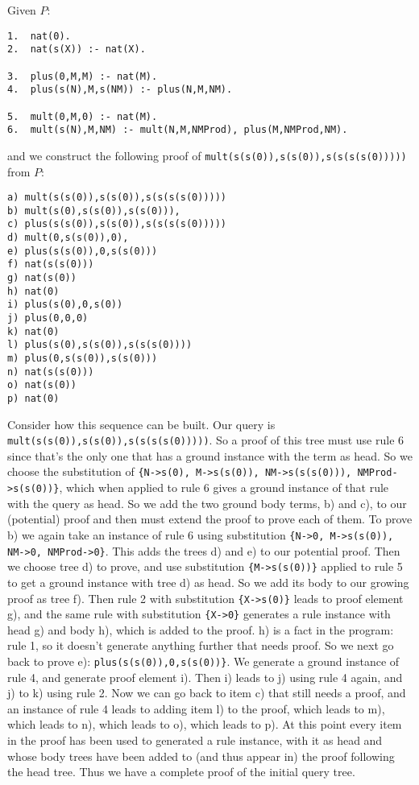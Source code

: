 \begin{example}
  Given $P$:
\begin{verbatim}
1.  nat(0).
2.  nat(s(X)) :- nat(X).

3.  plus(0,M,M) :- nat(M).
4.  plus(s(N),M,s(NM)) :- plus(N,M,NM).

5.  mult(0,M,0) :- nat(M).
6.  mult(s(N),M,NM) :- mult(N,M,NMProd), plus(M,NMProd,NM).
\end{verbatim}
and we construct the following  proof of
\verb|mult(s(s(0)),s(s(0)),s(s(s(s(0)))))| from $P$:
\begin{verbatim}
a) mult(s(s(0)),s(s(0)),s(s(s(s(0)))))
b) mult(s(0),s(s(0)),s(s(0))),
c) plus(s(s(0)),s(s(0)),s(s(s(s(0)))))
d) mult(0,s(s(0)),0),
e) plus(s(s(0)),0,s(s(0)))
f) nat(s(s(0)))
g) nat(s(0))
h) nat(0)
i) plus(s(0),0,s(0))
j) plus(0,0,0)
k) nat(0)
l) plus(s(0),s(s(0)),s(s(s(0))))
m) plus(0,s(s(0)),s(s(0)))
n) nat(s(s(0)))
o) nat(s(0))
p) nat(0)
\end{verbatim}
Consider how this sequence can be built.  Our query is
\verb|mult(s(s(0)),s(s(0)),s(s(s(s(0)))))|.  So a proof of this tree
must use rule 6 since that's the only one that has a ground instance
with the term as head.  So we choose the substitution of
\verb|{N->s(0), M->s(s(0)), NM->s(s(s(0))), NMProd->s(s(0))}|, which
when applied to rule 6 gives a ground instance of that rule with the
query as head.  So we add the two ground body terms, b) and c), to our
(potential) proof and then must extend the proof to prove each of
them.  To prove b) we again take an instance of rule 6 using
substitution \verb|{N->0, M->s(s(0)), NM->0, NMProd->0}|.  This adds
the trees d) and e) to our potential proof.  Then we choose tree d) to
prove, and use substitution \verb|{M->s(s(0))}| applied to rule 5 to
get a ground instance with tree d) as head.  So we add its body to our
growing proof as tree f).  Then rule 2 with substitution
\verb|{X->s(0)}| leads to proof element g), and the same rule with
substitution \verb|{X->0}| generates a rule instance with head g) and
body h), which is added to the proof.  h) is a fact in the program:
rule 1, so it doesn't generate anything further that needs proof.  So
we next go back to prove e): \verb|plus(s(s(0)),0,s(s(0))}|.  We
generate a ground instance of rule 4, and generate proof element i).
Then i) leads to j) using rule 4 again, and j) to k) using rule 2.
Now we can go back to item c) that still needs a proof, and an
instance of rule 4 leads to adding item l) to the proof, which leads
to m), which leads to n), which leads to o), which leads to p).  At
this point every item in the proof has been used to generated a rule
instance, with it as head and whose body trees have been added to (and
thus appear in) the proof following the head tree.  Thus we have a
complete proof of the initial query tree.
\end{example}

